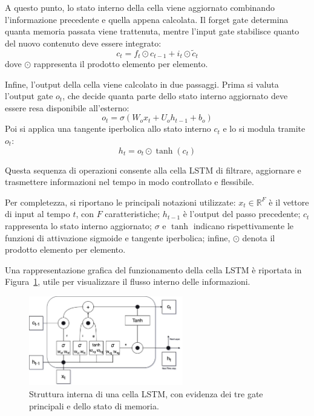 \documentclass{article}
\begin{document}
A questo punto, lo stato interno della cella viene aggiornato combinando l’informazione precedente e 
quella appena calcolata. Il forget gate determina quanta memoria passata viene trattenuta, mentre 
l’input gate stabilisce quanto del nuovo contenuto deve essere integrato:
\begin{equation}
c_t = f_t \odot c_{t-1} + i_t \odot \tilde{c}_t
\end{equation}
dove $\odot$ rappresenta il prodotto elemento per elemento.

Infine, l’output della cella viene calcolato in due passaggi. Prima si valuta l’output gate $o_t$, che 
decide quanta parte dello stato interno aggiornato deve essere resa disponibile all’esterno:
\begin{equation}
o_t = \sigma(W_o x_t + U_o h_{t-1} + b_o)
\end{equation}
Poi si applica una tangente iperbolica allo stato interno $c_t$ e lo si modula tramite $o_t$:
\begin{equation}
h_t = o_t \odot \tanh(c_t)
\end{equation}

Questa sequenza di operazioni consente alla cella LSTM di filtrare, aggiornare e trasmettere informazioni 
nel tempo in modo controllato e flessibile.

Per completezza, si riportano le principali notazioni utilizzate: $x_t \in \mathbb{R}^F$ è il vettore di 
input al tempo $t$, con $F$ caratteristiche; $h_{t-1}$ è l’output del passo precedente; $c_t$ rappresenta 
lo stato interno aggiornato; $\sigma$ e $\tanh$ indicano rispettivamente le funzioni di attivazione 
sigmoide e tangente iperbolica; infine, $\odot$ denota il prodotto elemento per elemento.

Una rappresentazione grafica del funzionamento della cella LSTM è riportata in Figura~\ref{fig:lstm_cell}, 
utile per visualizzare il flusso interno delle informazioni.

\begin{figure}[htbp]
    \centering
    \includegraphics[width=0.6\textwidth]{img/LSTM.png}
    \caption{Struttura interna di una cella LSTM, con evidenza dei tre gate principali e dello stato di memoria.}
    \label{fig:lstm_cell}
\end{figure}
\end{document}
